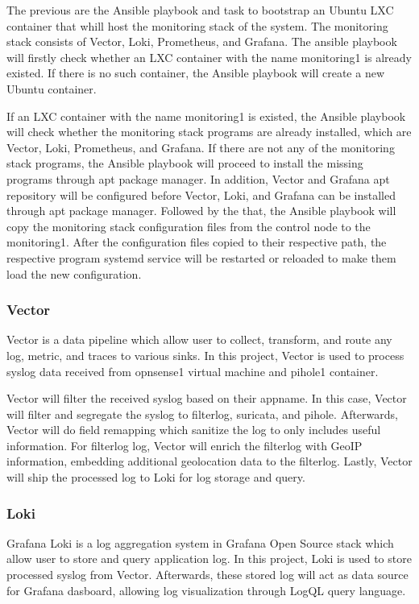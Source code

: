 \documentclass[../index.tex]{subfiles}
\begin{document}
The previous are the Ansible playbook and task to bootstrap an Ubuntu LXC container that whill host
the monitoring stack of the system. The monitoring stack consists of Vector, Loki, Prometheus, and
Grafana. The ansible playbook will firstly check whether an LXC container with the name monitoring1
is already existed. If there is no such container, the Ansible playbook will create a new Ubuntu
container.

If an LXC container with the name monitoring1 is existed, the Ansible playbook will check whether
the monitoring stack programs are already installed, which are Vector, Loki, Prometheus, and
Grafana. If there are not any of the monitoring stack programs, the Ansible playbook will proceed to
install the missing programs through apt package manager. In addition, Vector and Grafana apt
repository will be configured before Vector, Loki, and Grafana can be installed through apt package
manager. Followed by the that, the Ansible playbook will copy the monitoring stack configuration
files from the control node to the monitoring1. After the configuration files copied to their
respective path, the respective program systemd service will be restarted or reloaded to make them
load the new configuration.

\subsubsection{Vector}

Vector is a data pipeline which allow user to collect, transform, and route any log, metric, and
traces to various sinks. In this project, Vector is used to process syslog data received from
opnsense1 virtual machine and pihole1 container.

Vector will filter the received syslog based on their appname. In this case, Vector will filter and
segregate the syslog to filterlog, suricata, and pihole. Afterwards, Vector will do field remapping
which sanitize the log to only includes useful information. For filterlog log, Vector will enrich
the filterlog with GeoIP information, embedding additional geolocation data to the filterlog.
Lastly, Vector will ship the processed log to Loki for log storage
and query.

\subsubsection{Loki}

Grafana Loki is a log aggregation system in Grafana Open Source stack which allow user to store and
query application log. In this project, Loki is used to store processed syslog from Vector.
Afterwards, these stored log will act as data source for Grafana dasboard, allowing log
visualization through LogQL query language.
\end{document}
